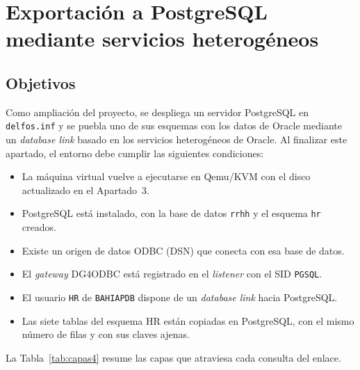 
\newpage
\section{Exportación a PostgreSQL mediante servicios heterogéneos}
\label{sec:apartado4}

\subsection{Objetivos}

Como ampliación del proyecto, se despliega un servidor PostgreSQL en \texttt{delfos.inf} y se puebla uno de sus esquemas con los datos de Oracle mediante un \textit{database link} basado en los servicios heterogéneos de Oracle. Al finalizar este apartado, el entorno debe cumplir las siguientes condiciones:

\begin{itemize}
    \item La máquina virtual vuelve a ejecutarse en Qemu/KVM con el disco actualizado en el Apartado~3.
    \item PostgreSQL está instalado, con la base de datos \texttt{rrhh} y el esquema \texttt{hr} creados.
    \item Existe un origen de datos ODBC (DSN) que conecta con esa base de datos.
    \item El \textit{gateway} DG4ODBC está registrado en el \textit{listener} con el SID \texttt{PGSQL}.
    \item El usuario \texttt{HR} de \texttt{BAHIAPDB} dispone de un \textit{database link} hacia PostgreSQL.
    \item Las siete tablas del esquema HR están copiadas en PostgreSQL, con el mismo número de filas y con sus claves ajenas.
\end{itemize}

La Tabla~\ref{tab:capas4} resume las capas que atraviesa cada consulta del enlace.

